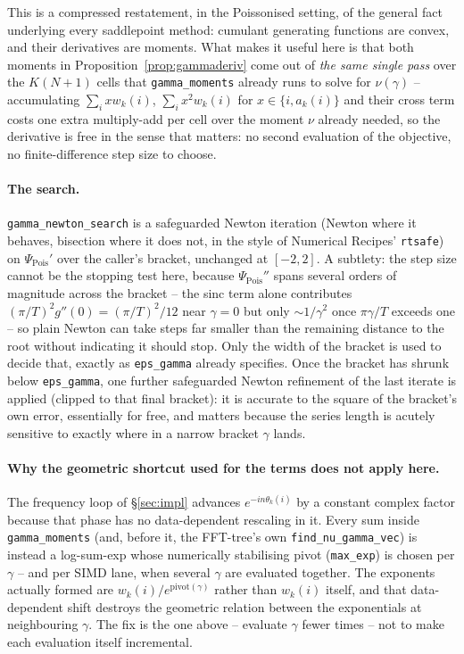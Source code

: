 \documentclass[11pt]{article}
\begin{document}
This is a compressed restatement, in the Poissonised setting, of the general fact underlying every
saddlepoint method: cumulant generating functions are convex, and their derivatives are moments.
What makes it useful here is that both moments in
Proposition~\ref{prop:gammaderiv} come out of \emph{the same single pass} over the $K(N+1)$ cells
that \texttt{gamma\_moments} already runs to solve for $\nu(\gamma)$ -- accumulating $\sum_i xw_k(i)$,
$\sum_ix^2w_k(i)$ for $x\in\{i,a_k(i)\}$ and their cross term costs one extra multiply-add per cell
over the moment $\nu$ already needed, so the derivative is free in the sense that matters: no
second evaluation of the objective, no finite-difference step size to choose.

\paragraph{The search.} \texttt{gamma\_newton\_search} is a safeguarded Newton iteration (Newton
where it behaves, bisection where it does not, in the style of Numerical Recipes' \texttt{rtsafe})
on $\Psi_{\mathrm{Pois}}'$ over the caller's bracket, unchanged at $[-2,2]$. A subtlety: the step
size cannot be the stopping test here, because $\Psi_{\mathrm{Pois}}''$ spans several orders of
magnitude across the bracket -- the sinc term alone contributes $(\pi/T)^2g''(0)=(\pi/T)^2/12$ near
$\gamma=0$ but only $\sim1/\gamma^2$ once $\pi\gamma/T$ exceeds one -- so plain Newton can take
steps far smaller than the remaining distance to the root without indicating it should stop. Only
the width of the bracket is used to decide that, exactly as \texttt{eps\_gamma} already specifies.
Once the bracket has shrunk below \texttt{eps\_gamma}, one further safeguarded Newton refinement
of the last iterate is applied (clipped to that final bracket): it is accurate to the square of the
bracket's own error, essentially for free, and matters because the series length is acutely
sensitive to exactly where in a narrow bracket $\gamma$ lands.

\paragraph{Why the geometric shortcut used for the terms does not apply here.} The frequency loop
of \S\ref{sec:impl} advances $e^{-in\theta_k(i)}$ by a constant complex factor because that phase
has no data-dependent rescaling in it. Every sum inside \texttt{gamma\_moments} (and, before it,
the FFT-tree's own \texttt{find\_nu\_gamma\_vec}) is instead a log-sum-exp whose numerically
stabilising pivot (\texttt{max\_exp}) is chosen per $\gamma$ -- and per SIMD lane, when several
$\gamma$ are evaluated together. The exponents actually formed are $w_k(i)/e^{\text{pivot}(\gamma)}$
rather than $w_k(i)$ itself, and that data-dependent shift destroys the geometric relation between
the exponentials at neighbouring $\gamma$. The fix is the one above -- evaluate $\gamma$ fewer
times -- not to make each evaluation itself incremental.
\end{document}
